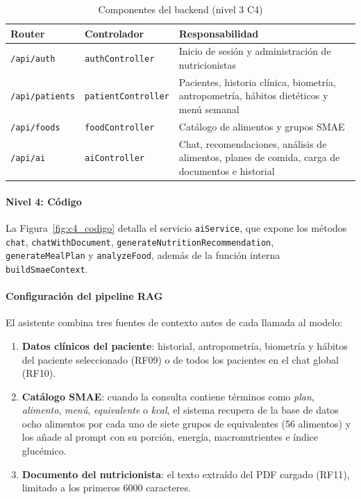 \begin{table}[H]
\centering\small
\caption{Componentes del backend (nivel 3 C4)}\label{tab:c4_comp}
\begin{tabularx}{\linewidth}{|l|l|X|}
\hline
\textbf{Router} & \textbf{Controlador} & \textbf{Responsabilidad} \\ \hline
\texttt{/api/auth} & \texttt{authController} & Inicio de sesión y administración de nutricionistas \\ \hline
\texttt{/api/patients} & \texttt{patientController} & Pacientes, historia clínica, biometría, antropometría, hábitos dietéticos y menú semanal \\ \hline
\texttt{/api/foods} & \texttt{foodController} & Catálogo de alimentos y grupos SMAE \\ \hline
\texttt{/api/ai} & \texttt{aiController} & Chat, recomendaciones, análisis de alimentos, planes de comida, carga de documentos e historial \\ \hline
\end{tabularx}
\end{table}


\paragraph{Nivel 4: Código}

La Figura~\ref{fig:c4_codigo} detalla el servicio \texttt{aiService}, que expone
los métodos \texttt{chat}, \texttt{chatWithDocument},
\texttt{generateNutritionRecommendation}, \texttt{generateMealPlan} y
\texttt{analyzeFood}, además de la función interna \texttt{buildSmaeContext}.


\paragraph{Configuración del pipeline RAG}

El asistente combina tres fuentes de contexto antes de cada llamada al modelo:

\begin{enumerate}[leftmargin=2em]
  \item \textbf{Datos clínicos del paciente}: historial, antropometría,
        biometría y hábitos del paciente seleccionado (RF09) o de todos los
        pacientes en el chat global (RF10).
  \item \textbf{Catálogo SMAE}: cuando la consulta contiene términos como
        \emph{plan}, \emph{alimento}, \emph{menú}, \emph{equivalente} o
        \emph{kcal}, el sistema recupera de la base de datos ocho alimentos por
        cada uno de siete grupos de equivalentes (56 alimentos) y los añade al
        prompt con su porción, energía, macronutrientes e índice glucémico.
  \item \textbf{Documento del nutricionista}: el texto extraído del PDF cargado
        (RF11), limitado a los primeros 6000 caracteres.
\end{enumerate}

